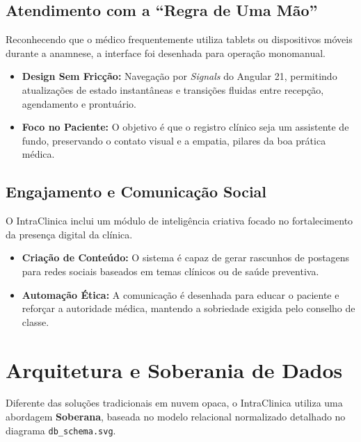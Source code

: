 \documentclass[11pt,a4paper,oneside]{article}
\begin{document}
\subsection{Atendimento com a ``Regra de Uma Mão''}
Reconhecendo que o médico frequentemente utiliza tablets ou dispositivos móveis durante a anamnese, a interface foi desenhada para operação monomanual.
\begin{itemize}
    \item \textbf{Design Sem Fricção:} Navegação por \textit{Signals} do Angular 21, permitindo atualizações de estado instantâneas e transições fluidas entre recepção, agendamento e prontuário.
    \item \textbf{Foco no Paciente:} O objetivo é que o registro clínico seja um assistente de fundo, preservando o contato visual e a empatia, pilares da boa prática médica.
\end{itemize}

\subsection{Engajamento e Comunicação Social}
O IntraClinica inclui um módulo de inteligência criativa focado no fortalecimento da presença digital da clínica.
\begin{itemize}
    \item \textbf{Criação de Conteúdo:} O sistema é capaz de gerar rascunhos de postagens para redes sociais baseados em temas clínicos ou de saúde preventiva.
    \item \textbf{Automação Ética:} A comunicação é desenhada para educar o paciente e reforçar a autoridade médica, mantendo a sobriedade exigida pelo conselho de classe.
\end{itemize}

\section{Arquitetura e Soberania de Dados}
Diferente das soluções tradicionais em nuvem opaca, o IntraClinica utiliza uma abordagem \textbf{Soberana}, baseada no modelo relacional normalizado detalhado no diagrama \texttt{db\_schema.svg}.
\end{document}
